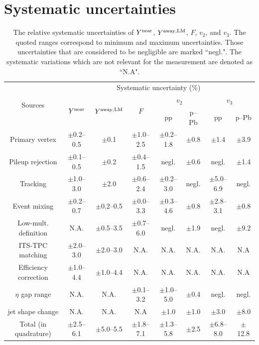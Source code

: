 
\section{Systematic uncertainties}
\label{sec:uncertainties}

\begin{table}[h!]
\caption{The relative systematic uncertainties of $Y^{\rm{near}}$, $Y^{\rm{away,LM}}$, $F$, $v_{2}$, and $v_{3}$. The quoted ranges correspond to minimum and maximum uncertainties. Those uncertainties that are considered to be negligible are marked ``negl.". The systematic variations which are not relevant for the measurement are denoted as ``N.A".}
\centering
\label{tab:syst}
\resizebox{\textwidth}{!} {
\begin{tabular}{c|ccccccc}
\hline 
\multirow{3}{*}{Sources}  & \multicolumn{7}{c}{Systematic uncertainty (\%)} \\ \cline{2-8} 
& \multirow{2}{*}{$Y^{\rm{near}}$} & \multirow{2}{*}{$Y^{\rm{away,LM}}$} & \multirow{2}{*}{$F$} & \multicolumn{2}{c}{$v_{2}$} & \multicolumn{2}{c}{$v_{3}$}  \\   \cline{5-8}
& & & & pp & p--Pb & pp & p--Pb  \\ \cline{1-8} 
Primary vertex       & $\pm$0.2--0.5 & $\pm$0.1      & $\pm$1.0--2.5 & $\pm$0.2--1.8 & $\pm$0.8 & $\pm$1.4 & $\pm$3.9 \\ 
Pileup rejection     & $\pm$0.1--0.5 & $\pm$0.2      & $\pm$0.4--1.5 & negl.         & $\pm$0.6 & negl. & $\pm$1.4 \\ 
Tracking		     & $\pm$1.0--3.0 & $\pm$2.0      & $\pm$0.6--2.4 & $\pm$0.2--3.0 & negl. & $\pm$5.0--6.9 & negl. \\ 
Event mixing	     & $\pm$0.2--0.7 & $\pm$0.2--0.5 & $\pm$0.0--3.3 & $\pm$0.3--4.6 & $\pm$0.8 & $\pm$2.8--3.1 & $\pm$0.8 \\ 
Low-mult. definition & N.A.          & $\pm$0.5--3.5 & $\pm$0.7--6.0 & negl.         & $\pm$1.9 & negl. & $\pm$9.2\\ 
ITS-TPC matching 	 & $\pm$2.0--3.0 & $\pm$2.0--3.0 & N.A.          & N.A.          & N.A. & N.A. & N.A\\ 
Efficiency correction& $\pm$1.0--4.4 & $\pm$1.0--4.4 & N.A.          & N.A.          & N.A. & N.A. & N.A\\ 
$\eta$ gap range   	 & N.A.          & N.A.          & $\pm$0.1--3.2 & $\pm$1.0--5.0 & $\pm$0.4 & negl. & negl. \\ 
jet shape change   	 & N.A.          & N.A.          & N.A &  $\pm$1.0& $\pm$1.0 & $\pm$3.0 & $\pm$8.0 \\ 
\hline 
Total (in quadrature)& $\pm$2.5--6.1 & $\pm$5.0--5.5 & $\pm$1.8--7.1 & $\pm$1.3--5.8 & $\pm$2.5 & $\pm$6.8--8.0 & $\pm$12.8 \\ 
\hline 
\end{tabular}
}
\end{table}


